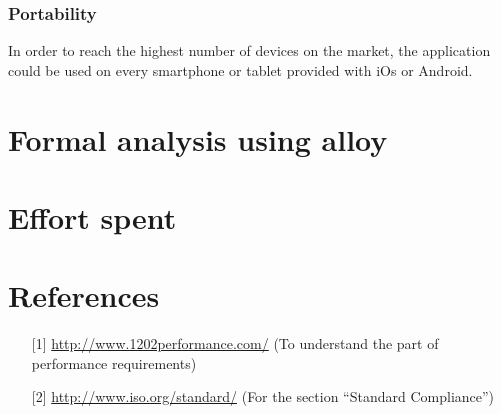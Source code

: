 \documentclass[12pt,titlepage]{article}
\begin{document}
\subsubsection{Portability}\label{sec:mod1}
In order to reach the highest number of devices on the market, the application could be used on every smartphone or tablet provided with iOs or Android. 
\pagebreak
\section{Formal analysis using alloy}\label{sec:crit}
\pagebreak
\section{Effort spent}\label{sec:crit}
\pagebreak

\section{References}\label{sec:crit}
\begin{itemize}
\item [{[1]}] \url{http://www.1202performance.com/} (To understand the part of performance requirements)
\item [{[2]}] \url{http://www.iso.org/standard/} (For the section ``Standard Compliance'')
\end{itemize}
\end{document}
